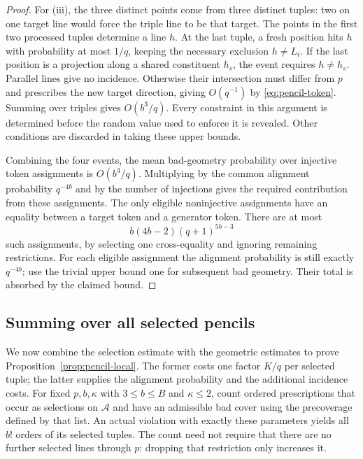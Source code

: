 \begin{proof}
For (iii), the three distinct points come from three distinct tuples:
two on one target line would force the triple line to be that target.
The points in the first two processed tuples determine a line $h$.
At the last tuple, a fresh position hits $h$ with probability at most
$1/q$, keeping the necessary exclusion $h\ne L_i$.  If the last position
is a projection along a shared constituent $h_s$, the event requires
$h\ne h_s$.  Parallel lines give no incidence.  Otherwise their
intersection must differ from $p$ and prescribes the new target direction,
giving $O(q^{-1})$ by \eqref{eq:pencil-token}.  Summing over triples gives
$O(b^3/q)$.  Every constraint in this argument is determined before the
random value used to enforce it is revealed.  Other conditions are
discarded in taking these upper bounds.

Combining the four events, the mean bad-geometry probability over
injective token assignments is $O(b^3/q)$.  Multiplying by the common
alignment probability $q^{-4b}$ and by the number of injections gives
the required contribution from these assignments.  The only eligible
noninjective assignments have an equality between a target token and a
generator token.  There are at most
\[
 b(4b-2)(q+1)^{5b-3}
\]
such assignments, by selecting one cross-equality and ignoring remaining
restrictions.  For each eligible assignment the alignment probability is
still exactly $q^{-4b}$; use the trivial upper bound one for subsequent
bad geometry.  Their total is absorbed by the claimed bound.
\end{proof}

\subsection{Summing over all selected pencils}

We now combine the selection estimate with the geometric estimates to
prove Proposition~\ref{prop:pencil-local}.  The former costs one factor
$K/q$ per selected tuple; the latter supplies the alignment probability
and the additional incidence costs.  For fixed $p,b,\kappa$ with
$3\le b\le B$ and $\kappa\le2$, count ordered prescriptions that occur
as selections on $\mathcal A$ and have an admissible bad cover using the
precoverage defined by that list.  An actual violation with exactly these
parameters yields all $b!$ orders of
its selected tuples.  The count need not require that there are no further
selected lines through $p$: dropping that restriction only increases it.

